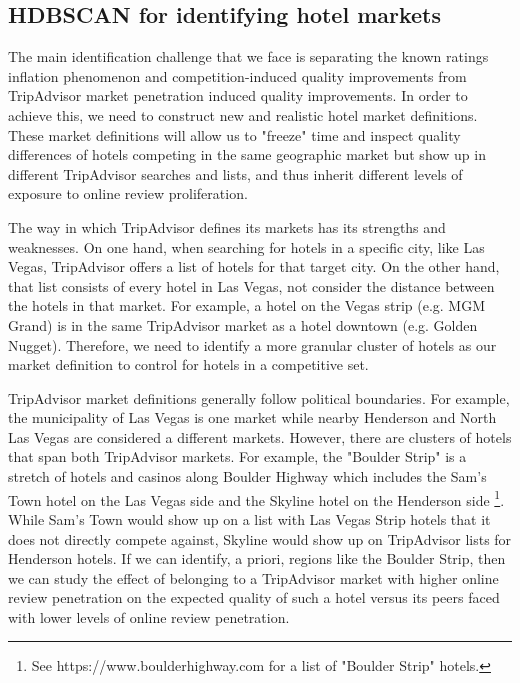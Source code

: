 \documentclass[mksc,blindrev]{informs3} %
\begin{document}
\subsection{HDBSCAN for identifying hotel markets}\label{sec:hdbscan}
The main identification challenge that we face is separating the known ratings inflation phenomenon and competition-induced quality improvements from TripAdvisor market penetration induced quality improvements. In order to achieve this, we need to construct new and realistic hotel market definitions. These market definitions will allow us to "freeze" time and inspect quality differences of hotels competing in the same geographic market but show up in different TripAdvisor searches and lists, and thus inherit different levels of exposure to online review proliferation.

The way in which TripAdvisor defines its markets has its strengths and weaknesses. On one hand, when searching for hotels in a specific city, like Las Vegas, TripAdvisor offers a list of hotels for that target city. On the other hand, that list consists of every hotel in Las Vegas, not consider the distance between the hotels in that market. For example, a hotel on the Vegas strip (e.g. MGM Grand) is in the same TripAdvisor market as a hotel downtown (e.g. Golden Nugget). Therefore, we need to identify a more granular cluster of hotels as our market definition to control for hotels in a competitive set.

TripAdvisor market definitions generally follow political boundaries. For example, the municipality of Las Vegas is one market while nearby Henderson and North Las Vegas are considered a different markets. However, there are clusters of hotels that span both TripAdvisor markets. For example, the "Boulder Strip" is a stretch of hotels and casinos along Boulder Highway which includes the Sam's Town hotel on the Las Vegas side and the Skyline hotel on the Henderson side \footnote{See https://www.boulderhighway.com for a list of "Boulder Strip" hotels.}. While Sam's Town would show up on a list with Las Vegas Strip hotels that it does not directly compete against, Skyline would show up on TripAdvisor lists for Henderson hotels. If we can identify, a priori, regions like the Boulder Strip, then we can study the effect of belonging to a TripAdvisor market with higher online review penetration on the expected quality of such a hotel versus its peers faced with lower levels of online review penetration.
\end{document}
